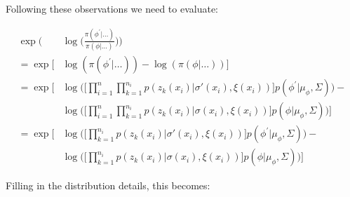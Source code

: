\documentclass{article}
\begin{document}
Following these observations we need to evaluate:

\begin{align*}
\exp \bigg( & \log \bigg (\frac{\pi(\phi^{'} | \dots ) }{ \pi(\phi | \dots ) } \bigg) \bigg) \\
= \exp \big[ & \log(\pi(\phi^{'} | \dots )) - \log(\pi(\phi | \dots )) \big] \\
= \exp \Big[ & \log \Big( \Big[ \prod_{i=1}^n \prod_{k=1}^{n_i} p(z_k(x_i) | \sigma'(x_i), \xi(x_i)) \Big] p(\phi^{'} | \mu_\phi, \Sigma) \Big) - \\
& \log \Big( \Big[ \prod_{i=1}^n \prod_{k=1}^{n_i} p(z_k(x_i) | \sigma(x_i), \xi(x_i)) \Big] p(\phi | \mu_\phi, \Sigma) \Big) \Big] \\
= \exp \Big[ & \log \Big( \Big[ \prod_{k=1}^{n_i} p(z_k(x_i) | \sigma'(x_i), \xi(x_i)) \Big] p(\phi^{'} | \mu_\phi, \Sigma) \Big) - \\
& \log \Big( \Big[ \prod_{k=1}^{n_i} p(z_k(x_i) | \sigma(x_i), \xi(x_i)) \Big] p(\phi | \mu_\phi, \Sigma) \Big) \Big]
\end{align*}

Filling in the distribution details, this becomes:
\end{document}
